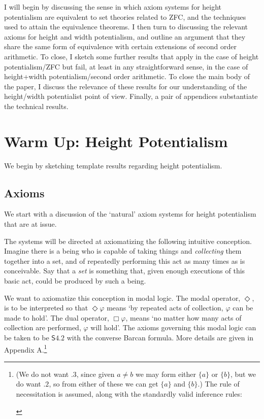 \documentclass{article}
\begin{document}
I will begin by discussing the sense in which axiom systems for height potentialism
are equivalent to set theories related to ZFC, and the techniques used to attain 
the equivalence theorems. I then turn to discussing the relevant axioms 
for height and width 
potentialism, and outline an argument that they share the same form of equivalence with certain extensions 
of second order arithmetic. To close, I sketch some further results that apply in the 
case of height potentialism/ZFC but fail, at least in any straightforward sense, 
in the case of height+width potentialism/second order arithmetic. 
To close the main body of the paper, I discuss the relevance of these results for our understanding 
of the height/width potentialist point of view.
Finally, a pair of appendices substantiate the technical results.
\section{Warm Up: Height Potentialism}
We begin by sketching template results regarding height potentialism. 
\subsection{Axioms}
We start with a discussion of the `natural' axiom systems for height potentialism 
that are at issue.

The systems will be directed at axiomatizing the following 
intuitive conception. Imagine there is a being who is capable of taking things 
and \emph{collecting} them together into a set, and of repeatedly performing this act 
as many times as is conceivable. Say that a \emph{set} is something that, given enough 
executions of this basic act, could be produced by such a being. 

We want to axiomatize this conception in modal logic. The modal operator, $\Diamond$, 
is to be interpreted so that $\Diamond \varphi$ means
`by repeated acts of collection, $\varphi$ can be made to hold'. The dual 
operator, $\Box \varphi$, means `no matter how many acts of collection are performed, 
$\varphi$ will hold'. The axioms governing this modal logic can be taken to be 
$\mathsf{S4.2}$ with the converse Barcan formula. More details are given in Appendix A.\footnote{(We do not want $.3$, 
since given $a \not= b$ we may form either $\{a\}$ or $\{b\}$, but we do want 
$.2$,
so from either of these we can get $\{a\}$ and $\{b\}$.) The rule of necessitation 
is assumed, along with the standardly valid inference rules:
\begin{prooftree}
\end{prooftree}}
 
\end{document}
